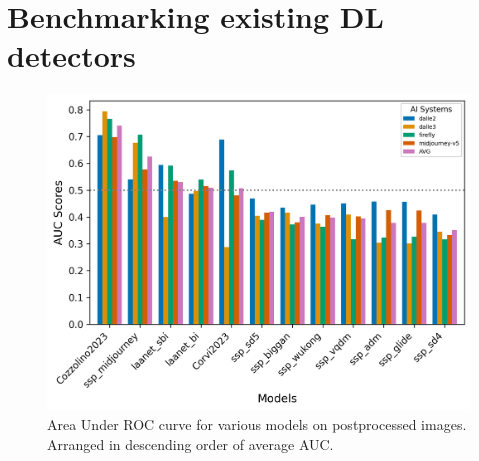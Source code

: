 \clearpage
\setcounter{page}{1}
\maketitlesupplementary
\def\phiorg{\mathop{\phi_{\rm{Org}}}\nolimits}

\section{Benchmarking existing DL detectors}
\label{sec:benchmarking}
\begin{figure}[!t]
    \centering
    \includegraphics[width=0.95\linewidth]{images/auc_bench.png}
    \caption{Area Under ROC curve for various models on postprocessed images. Arranged in descending order of average AUC.}
    \label{fig:auc_bench}
\end{figure}
